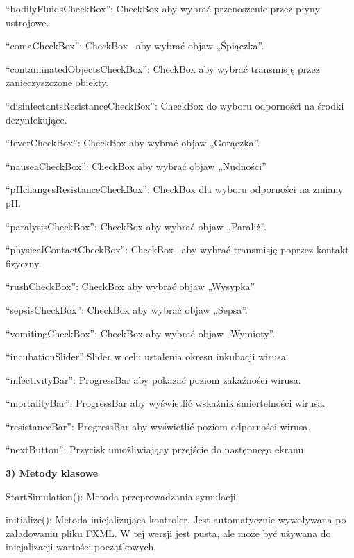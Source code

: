 \documentclass[a4paper]{article}
\begin{document}
\foreignlanguage{polish}{“bodilyFluidsCheckBox”: CheckBox aby wybrać przenoszenie przez płyny ustrojowe.}

\foreignlanguage{polish}{“comaCheckBox”: CheckBox \ aby wybrać objaw „Śpiączka”.}

\foreignlanguage{polish}{“contaminatedObjectsCheckBox”: CheckBox aby wybrać transmisję przez zanieczyszczone obiekty.}

\foreignlanguage{polish}{“disinfectantsResistanceCheckBox”: CheckBox do wyboru odporności na środki dezynfekujące.}

\foreignlanguage{polish}{“feverCheckBox”: CheckBox aby wybrać objaw „Gorączka”.}

\foreignlanguage{polish}{“nauseaCheckBox”: CheckBox aby wybrać objaw „Nudności”}

\foreignlanguage{polish}{“pHchangesResistanceCheckBox”: CheckBox dla wyboru odporności na zmiany pH.}

\foreignlanguage{polish}{“paralysisCheckBox”: CheckBox aby wybrać objaw „Paraliż”.}

\foreignlanguage{polish}{“physicalContactCheckBox”: CheckBox \ aby wybrać transmisję poprzez kontakt fizyczny.}

\foreignlanguage{polish}{“rushCheckBox”: CheckBox aby wybrać objaw „Wysypka”}

\foreignlanguage{polish}{“sepsisCheckBox”: CheckBox aby wybrać objaw „Sepsa”.}

\foreignlanguage{polish}{“vomitingCheckBox”: CheckBox aby wybrać objaw „Wymioty”.}

\foreignlanguage{polish}{“incubationSlider”:Slider w celu ustalenia okresu inkubacji wirusa.}

\foreignlanguage{polish}{“infectivityBar”: ProgressBar aby pokazać poziom zakaźności wirusa.}

\foreignlanguage{polish}{“mortalityBar”: ProgressBar aby wyświetlić wskaźnik śmiertelności wirusa.}

\foreignlanguage{polish}{“resistanceBar”: ProgressBar aby wyświetlić poziom odporności wirusa.}

\foreignlanguage{polish}{“nextButton”: Przycisk umożliwiający przejście do następnego ekranu.}


\bigskip

\foreignlanguage{polish}{\textbf{3) Metody klasowe}}

\foreignlanguage{polish}{StartSimulation(): Metoda przeprowadzania symulacji.}

\foreignlanguage{polish}{initialize(): Metoda inicjalizująca kontroler. Jest automatycznie wywoływana po załadowaniu pliku FXML. W tej wersji jest pusta, ale może być używana do inicjalizacji wartości początkowych.}
\end{document}
